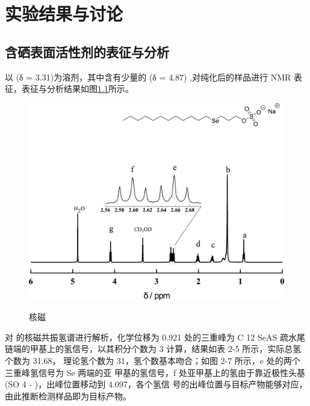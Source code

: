 \documentclass[bachelor,fandolfonts,replaceperiod]{jnuthesis} %
\begin{document}
    \chapter{实验结果与讨论}\label{chapter:results}
    \section{含硒表面活性剂的表征与分析}
    以 (δ = 3.31)为溶剂，其中含有少量的 (δ = 4.87)\cite{babij2016nmr} ,对纯化后的样品进行
     NMR 表征，表征与分析结果如图\ref{fig:NMR-12+3}所示。
    \begin{figure}[htbp]
        \centering
        \includegraphics[width=.7\textwidth]{figure/nmr1232.pdf}\\
        \caption{核磁}\label{fig:NMR-12+3}
    \end{figure}
    
    对  的核磁共振氢谱进行解析，化学位移为 0.921 处的三重峰为 C 12 SeAS 疏水尾
    链端的甲基上的氢信号，以其积分个数为 3 计算，结果如表 2-5 所示，实际总氢个数为 31.68，
    理论氢个数为 31，氢个数基本吻合；如图 2-7 所示，e 处的两个三重峰氢信号为 Se 两端的亚
    甲基的氢信号，f 处亚甲基上的氢由于靠近极性头基(SO 4 - )，出峰位置移动到 4.097，各个氢信
    号的出峰位置与目标产物能够对应，由此推断检测样品即为目标产物。
    
\end{document}
